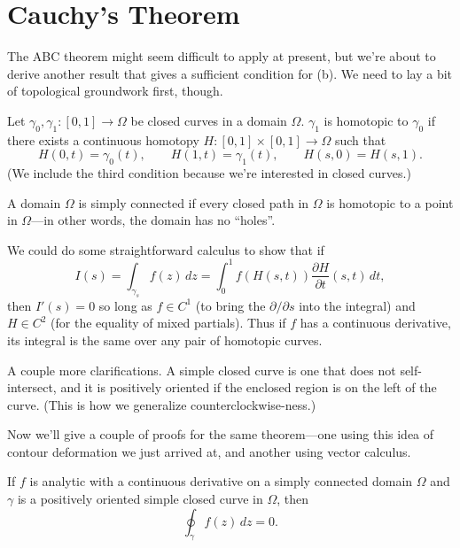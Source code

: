 \documentclass[../m136main.tex]{subfiles}
\begin{document}
\section{Cauchy's Theorem}
The ABC theorem might seem difficult to apply at present, but we're about to derive another result that gives a sufficient condition for (b).
We need to lay a bit of topological groundwork first, though.

\begin{definition}[Homotopy]
    Let $\gamma_0, \gamma_1 : [0,1] \to \Omega$ be closed curves in a domain $\Omega$.
    $\gamma_1$ is homotopic to $\gamma_0$ if there exists a continuous homotopy $H : [0,1] \times [0,1] \to \Omega$ such that
    \[ H(0,t) = \gamma_0(t), \qquad H(1,t) = \gamma_1(t), \qquad H(s,0) = H(s,1). \]
    (We include the third condition because we're interested in closed curves.)
\end{definition}

\begin{definition}
    A domain $\Omega$ is simply connected if every closed path in $\Omega$ is homotopic to a point in $\Omega$---in other words, the domain has no ``holes''.
\end{definition}

We could do some straightforward calculus to show that if
\[ I(s) = \int_{\gamma_s} f(z) \,dz = \int_0^1 f(H(s,t)) \frac{\partial H}{\partial t} (s,t) \,dt, \]
then $I'(s) = 0$ so long as $f \in C^1$ (to bring the $\partial / \partial s$ into the integral) and $H \in C^2$ (for the equality of mixed partials).
Thus if $f$ has a continuous derivative, its integral is the same over any pair of homotopic curves.

A couple more clarifications.
A simple closed curve is one that does not self-intersect, and it is positively oriented if the enclosed region is on the left of the curve.
(This is how we generalize counterclockwise-ness.)

\pagebreak

Now we'll give a couple of proofs for the same theorem---one using this idea of contour deformation we just arrived at, and another using vector calculus.

\begin{theorem}
    If $f$ is analytic with a continuous derivative on a simply connected domain $\Omega$ and $\gamma$ is a positively oriented simple closed curve in $\Omega$, then
    \[ \oint_\gamma f(z) \,dz = 0. \]
\end{theorem}
\end{document}
